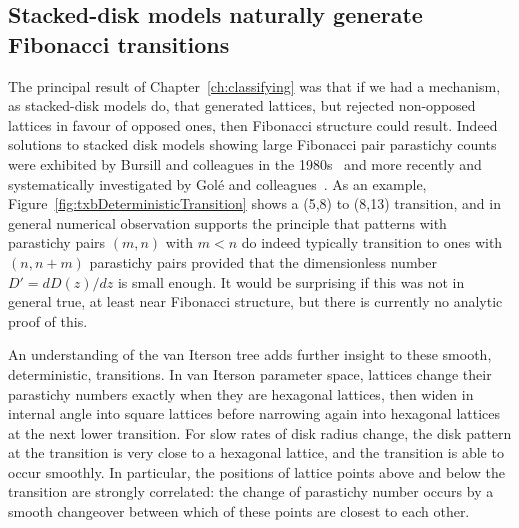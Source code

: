 \clearpage
\subsection{Stacked-disk models naturally generate Fibonacci transitions}
%

The principal result of Chapter~\ref{ch:classifying} was that if we had a mechanism, as stacked-disk models do, that generated lattices, but rejected non-opposed lattices in favour of opposed ones, then Fibonacci structure could result.   
Indeed solutions to stacked disk models showing large Fibonacci pair parastichy counts were exhibited by Bursill and colleagues in the 1980s~\cite{bursillSpiralLatticeConcepts1987,xudongPackingEqualDiscs1989} and more recently and systematically investigated by Gol\'e and colleagues~\cite{goleFibonacciQuasisymmetricPhyllotaxis2016}.
 As an example, Figure~\ref{fig:txbDeterministicTransition} shows a (5,8) to (8,13) transition, and in general numerical observation supports the principle that patterns with parastichy pairs $(m,n)$ with $m<n$ do indeed typically transition to ones with $(n,n+m)$ parastichy pairs provided that the dimensionless number $D'=dD(z)/dz$ is small enough. It would be surprising if this was not in general true, at least near Fibonacci structure, but there is currently no analytic proof of this.
 
 An understanding of the van Iterson tree adds further insight to these smooth, deterministic, transitions. In van Iterson parameter space, lattices change their parastichy numbers exactly when they are hexagonal lattices, then widen in internal angle into square lattices before narrowing again into hexagonal lattices at the next lower transition.  For slow rates of disk radius change, the disk pattern at the transition is very close to a hexagonal lattice, and the transition is able to occur smoothly. In particular, the positions of lattice points above and below the transition are strongly correlated: the change of parastichy number occurs by a smooth changeover between which of these points are closest to each other. 
 
